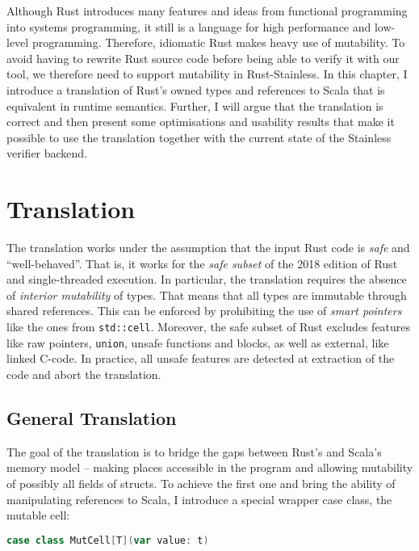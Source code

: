 Although Rust introduces many features and ideas from functional programming
into systems programming, it still is a language for high performance and
low-level programming. Therefore, idiomatic Rust makes heavy use of mutability.
To avoid having to rewrite Rust source code before being able to verify it with
our tool, we therefore need to support mutability in Rust-Stainless. In this
chapter, I introduce a translation of Rust's owned types and references to Scala
that is equivalent in runtime semantics. Further, I will argue that the
translation is correct and then present some optimisations and usability results
that make it possible to use the translation together with the current state of
the Stainless verifier backend.

\section{Translation}

The translation works under the assumption that the input Rust code is
\emph{safe} and ``well-behaved''. That is, it works for the \emph{safe subset}
\cite[section "Unsafety"]{rustref} of the 2018 edition of Rust and
single-threaded execution. In particular, the translation requires the absence
of \emph{interior mutability} \cite[section "Interior Mutability"]{rustref} of
types. That means that all types are immutable through shared references. This
can be enforced by prohibiting the use of \emph{smart pointers} like the ones
from \passthrough{\lstinline!std::cell!}. Moreover, the safe subset of Rust
excludes features like raw pointers, \passthrough{\lstinline!union!}, unsafe
functions and blocks, as well as external, like linked C-code. In practice, all
unsafe features are detected at extraction of the code and abort the
translation.


\subsection{General Translation}
\label{sec:translation}

The goal of the translation is to bridge the gaps between Rust's and Scala's
memory model -- making places accessible in the program and allowing mutability
of possibly all fields of structs. To achieve the first one and bring the
ability of manipulating references to Scala, I introduce a special wrapper case
class, the mutable cell:

\begin{lstlisting}[language=Scala, style=short]
case class MutCell[T](var value: t)
\end{lstlisting}


